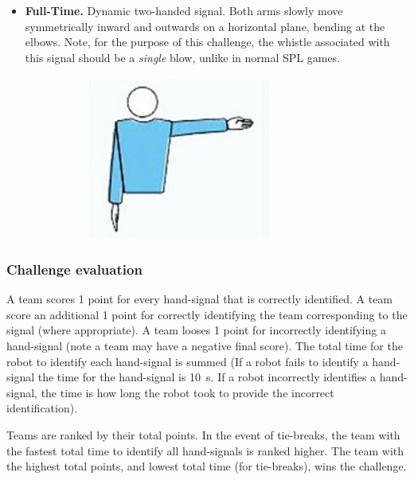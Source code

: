 \begin{itemize}
            \item \textbf{Full-Time.}
            Dynamic two-handed signal. Both arms slowly move symmetrically inward and outwards on a horizontal plane, bending at the elbows. Note, for the purpose of this challenge, the whistle associated with this signal should be a \textit{single} blow, unlike in normal SPL games.
            \begin{figure}[ht!]
                \centering
                \begin{subfigure}{.33\textwidth}
                  \includegraphics{figs/kick-off_referee.jpg}
                \end{subfigure}%
            \end{figure}

        \end{itemize}

    \subsubsection{Challenge evaluation}
        A team scores 1 point for every hand-signal that is correctly identified. A team score an additional 1 point for correctly identifying the team corresponding to the signal (where appropriate). A team looses 1 point for incorrectly identifying a hand-signal (note a team may have a negative final score). The total time for the robot to identify each hand-signal is summed (If a robot fails to identify a hand-signal the time for the hand-signal is \qty{10}{\second}. If a robot incorrectly identifies a hand-signal, the time is how long the robot took to provide the incorrect identification).
    
        Teams are ranked by their total points. In the event of tie-breaks, the team with the fastest total time to identify all hand-signals is ranked higher. The team with the highest total points, and lowest total time (for tie-breaks), wins the challenge. 

